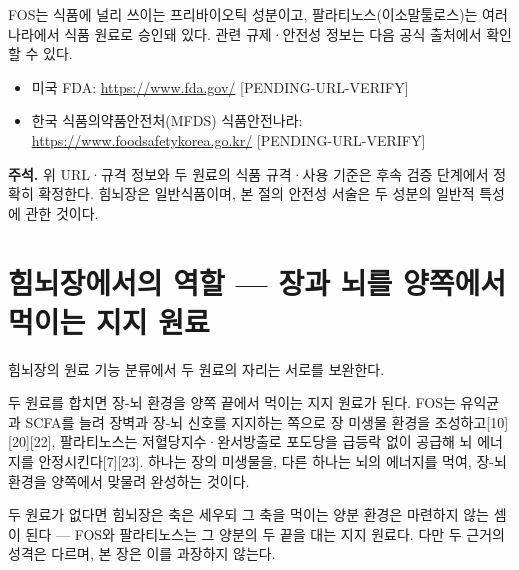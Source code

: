 \documentclass[12pt,oneside]{book}
\newenvironment{authnote}
  {\par\smallskip\begingroup\leftskip=6mm\rightskip=3mm\small\color{muted}\noindent\ignorespaces}
  {\par\endgroup\smallskip}
\begin{document}
FOS는 식품에 널리 쓰이는 프리바이오틱 성분이고, 팔라티노스(이소말툴로스)는 여러 나라에서 식품 원료로 승인돼 있다. 관련 규제·안전성 정보는 다음 공식 출처에서 확인할 수 있다.

\begin{itemize}[leftmargin=6mm,itemsep=1pt,topsep=2pt]
  \item 미국 FDA: \url{https://www.fda.gov/} [PENDING-URL-VERIFY]
  \item 한국 식품의약품안전처(MFDS) 식품안전나라: \url{https://www.foodsafetykorea.go.kr/} [PENDING-URL-VERIFY]
\end{itemize}

\begin{authnote}\textbf{주석.} 위 URL·규격 정보와 두 원료의 식품 규격·사용 기준은 후속 검증 단계에서 정확히 확정한다. 힘뇌장은 일반식품이며, 본 절의 안전성 서술은 두 성분의 일반적 특성에 관한 것이다.\end{authnote}

\section{힘뇌장에서의 역할 — 장과 뇌를 양쪽에서 먹이는 지지 원료}

힘뇌장의 원료 기능 분류에서 두 원료의 자리는 서로를 보완한다.

\vspace{2pt}\vspace{3pt}

두 원료를 합치면 장-뇌 환경을 양쪽 끝에서 먹이는 지지 원료가 된다. FOS는 유익균과 SCFA를 늘려 장벽과 장-뇌 신호를 지지하는 쪽으로 장 미생물 환경을 조성하고[10][20][22], 팔라티노스는 저혈당지수·완서방출로 포도당을 급등락 없이 공급해 뇌 에너지를 안정시킨다[7][23]. 하나는 장의 미생물을, 다른 하나는 뇌의 에너지를 먹여, 장-뇌 환경을 양쪽에서 맞물려 완성하는 것이다.

두 원료가 없다면 힘뇌장은 축은 세우되 그 축을 먹이는 양분 환경은 마련하지 않는 셈이 된다 — FOS와 팔라티노스는 그 양분의 두 끝을 대는 지지 원료다. 다만 두 근거의 성격은 다르며, 본 장은 이를 과장하지 않는다.
\end{document}
